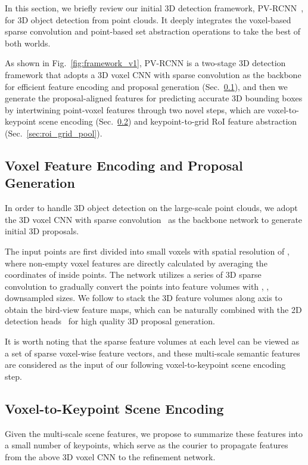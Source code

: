 \documentclass[natbib,twocolumn]{svjour3}          \smartqed  \usepackage{graphicx}
\begin{document}
In this section, we briefly review our initial 3D detection framework, PV-RCNN~\citep{shi2020pv}, for 3D object detection from point clouds. It deeply integrates the voxel-based sparse convolution and point-based set abstraction operations to take the best of both worlds.

As shown in Fig.~\ref{fig:framework_v1}, PV-RCNN is a two-stage 3D detection framework that adopts a 3D voxel CNN with sparse convolution as the backbone for efficient feature encoding and proposal generation (Sec.~\ref{sec:rpn}), and then we generate the proposal-aligned features for predicting accurate 3D bounding boxes by intertwining point-voxel features through two novel steps, which are voxel-to-keypoint scene encoding (Sec.~\ref{sec:vsa}) and keypoint-to-grid RoI feature abstraction (Sec.~\ref{sec:roi_grid_pool}).  

\subsection{Voxel Feature Encoding and Proposal Generation}\label{sec:rpn}
In order to handle 3D object detection on the large-scale point clouds, we adopt the 3D voxel CNN with sparse convolution~\citep{3DSemanticSegmentationWithSubmanifoldSparseConvNet} as the backbone network to generate initial 3D proposals.


The input points  are first divided into small voxels with spatial resolution of , where non-empty voxel features are directly calculated by averaging the coordinates of inside points. 
The network utilizes a series of 
3D sparse convolution to gradually convert the points into feature volumes with , ,  downsampled sizes. 
We follow \citep{yan2018second} to stack the 3D feature volumes along  axis to obtain the  bird-view feature maps, which can be naturally combined with the 2D detection heads~\citep{liu2016ssd,yin2021center} for high quality 3D proposal generation.  

It is worth noting that the sparse feature volumes at each level can be viewed as a set of sparse voxel-wise feature vectors, and these multi-scale semantic features are considered as the input of our following voxel-to-keypoint scene encoding step.


\subsection{Voxel-to-Keypoint Scene Encoding}\label{sec:vsa}
Given the multi-scale scene features, we propose to summarize these features into a small number of keypoints, which serve as the courier to propagate features from the above 3D voxel CNN to the refinement network.
\end{document}
